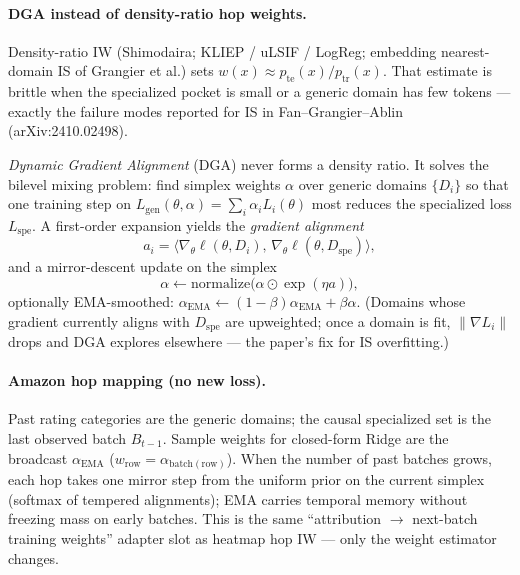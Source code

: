 
\paragraph{DGA instead of density-ratio hop weights.}
Density-ratio IW (Shimodaira; KLIEP / uLSIF / LogReg; embedding nearest-domain
IS of Grangier et al.) sets
$w(x)\approx p_{\mathrm{te}}(x)/p_{\mathrm{tr}}(x)$.
That estimate is brittle when the specialized pocket is small or a generic
domain has few tokens --- exactly the failure modes reported for IS in
Fan--Grangier--Ablin (arXiv:2410.02498).

\emph{Dynamic Gradient Alignment} (DGA) never forms a density ratio.
It solves the bilevel mixing problem: find simplex weights $\alpha$ over
generic domains $\{D_i\}$ so that one training step on
$L_{\mathrm{gen}}(\theta,\alpha)=\sum_i\alpha_i L_i(\theta)$ most reduces
the specialized loss $L_{\mathrm{spe}}$.
A first-order expansion yields the \emph{gradient alignment}
\begin{equation}
  a_i
  =
  \bigl\langle
    \nabla_\theta \ell(\theta,D_i),\,
    \nabla_\theta \ell(\theta,D_{\mathrm{spe}})
  \bigr\rangle,
\end{equation}
and a mirror-descent update on the simplex
\begin{equation}
  \alpha
  \leftarrow
  \mathrm{normalize}\bigl(\alpha\odot\exp(\eta a)\bigr),
\end{equation}
optionally EMA-smoothed:
$\alpha_{\mathrm{EMA}}\leftarrow(1-\beta)\alpha_{\mathrm{EMA}}+\beta\alpha$.
(Domains whose gradient currently aligns with $D_{\mathrm{spe}}$ are upweighted;
once a domain is fit, $\|\nabla L_i\|$ drops and DGA explores elsewhere ---
the paper's fix for IS overfitting.)

\paragraph{Amazon hop mapping (no new loss).}
Past rating categories are the generic domains; the causal specialized set is
the last observed batch $B_{t-1}$.
Sample weights for closed-form Ridge are the broadcast $\alpha_{\mathrm{EMA}}$
($w_{\mathrm{row}}=\alpha_{\mathrm{batch(row)}}$).
When the number of past batches grows, each hop takes one mirror step from the
uniform prior on the current simplex (softmax of tempered alignments); EMA
carries temporal memory without freezing mass on early batches.
This is the same ``attribution $\to$ next-batch training weights'' adapter
slot as heatmap hop IW --- only the weight estimator changes.


